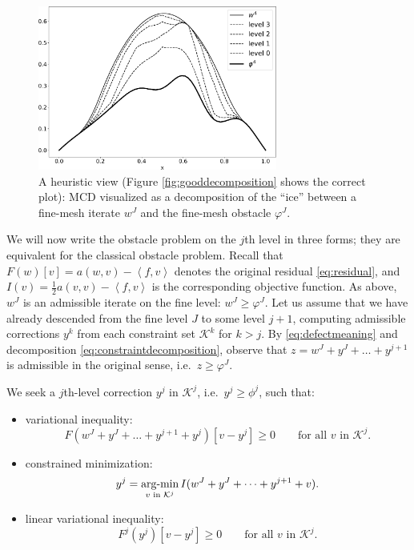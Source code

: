 \documentclass[letterpaper,final,12pt,reqno]{amsart}
\theoremstyle{claim}
\newcommand{\ip}[2]{\left<#1,#2\right>}
\numberwithin{equation}{section}
\numberwithin{figure}{section}
\numberwithin{table}{section}
\numberwithin{theorem}{section}
\begin{document}
\begin{figure}
\includegraphics[width=0.7\textwidth]{fixfigs/icedec_defect.pdf}
\caption{A heuristic view (Figure \ref{fig:gooddecomposition} shows the correct plot): MCD visualized as a decomposition of the ``ice'' between a fine-mesh iterate $w^J$ and the fine-mesh obstacle $\varphi^J$.}
\label{fig:icelikedecomposition}
\end{figure}

We will now write the obstacle problem on the $j$th level in three forms; they are equivalent for the classical obstacle problem.  Recall that $F(w)[v] = a(w,v) - \ip{f}{v}$ denotes the original residual \eqref{eq:residual}, and $I(v) = \frac{1}{2} a(v,v) - \ip{f}{v}$ is the corresponding objective function.  As above, $w^J$ is an admissible iterate on the fine level: $w^J\ge \varphi^J$.  Let us assume that we have already descended from the fine level $J$ to some level $j+1$, computing admissible corrections $y^k$ from each constraint set $\mathcal{K}^k$ for $k>j$.  By  \eqref{eq:defectmeaning} and decomposition \eqref{eq:constraintdecomposition}, observe that $z = w^J+y^J+\dots+y^{j+1}$ is admissible in the original sense, i.e.~$z\ge \varphi^J$.

We seek a $j$th-level correction $y^j$ in $\mathcal{K}^j$, i.e.~$y^j\ge \phi^j$, such that:
\begin{itemize}
\item variational inequality:
\begin{equation}
  F(w^J+y^J+\dots+y^{j+1}+y^j)[v - y^j] \ge 0 \qquad \text{for all } v \text{ in } \mathcal{K}^j.  \label{eq:mcdvi}
\end{equation}
\item constrained minimization:
\begin{equation}
  y^j = \mathop{\mathrm{arg\text{-}min}}_{v \text{ in } \mathcal{K}^j} I(w^J+y^J+\dots+y^{j+1}+v).  \label{eq:mcdminimization}
\end{equation}
\item linear variational inequality:
\begin{equation}
  F^j(y^j)[v - y^j] \ge 0 \qquad \text{for all } v \text{ in } \mathcal{K}^j.   \label{eq:mcdvilinear}
\end{equation}
\end{itemize}
\end{document}
